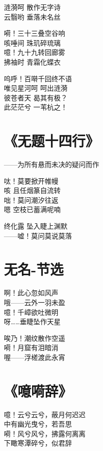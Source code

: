 涟漪呵 散作无字诗 \\
云翳哟 垂落未名丝
\vspace{1em}

嗬！三十三叠空谷响 \\
咳唾间 珠玑碎琉璃 \\
噫！九十九转回廊雾 \\
拂袖时 青霜化蝶衣
\vspace{1em}

呜呼！百啭千回终不语 \\
唯见星河呵 呵出涟漪 \\
彼苍者天 曷其有极？ \\
此茫茫兮 一苇杭之！

\clearpage


\section{《无题十四行》}

——为所有悬而未决的疑问而作
\vspace{1em}

呔！莫要掀开帷幔 \\
咳 且任烟篆自流转 \\
咄！莫问潮汐往返 \\
嗯 空枝已蓄满呢喃
\vspace{1em}

终化露 坠入睫上渊默 \\
——嘘！莫问莫说莫落

\clearpage


\section{无名-节选}

啊！此心忽如风声 \\
哦——云外一羽未盈 \\
噫！千嶂欲吐微明 \\
呀……垂睫坠作天星
\vspace{1em}

唉乃！潮纹散作空遥 \\
嗬！月窟有泪暗消 \\
喔——浮槎渡此永宵

\clearpage


\section{《噫嗬辞》}

噫！云兮云兮，蔽月何迟迟 \\
中有幽光曳兮，若吾思 \\
嗬！风兮风兮，拂露何离离 \\
下瞰寒潭碎兮，似君辞
\vspace{1em}

